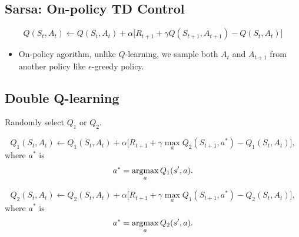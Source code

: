 \subsection{Sarsa: On-policy TD Control}
$$Q(S_t, A_t) \leftarrow Q(S_t, A_t)+ \alpha \Big[R_{t+1}+\gamma Q(S_{t+1}, A_{t+1})-Q(S_t, A_t)\Big] $$
\begin{itemize}
	\item On-policy agorithm, unlike $Q$-learning, we sample both $A_t$ and $A_{t+1}$ from another policy like $\epsilon$-greedy policy. 
\end{itemize}


\subsection{Double Q-learning}

Randomly select $Q_1$ or $Q_2$.

$$Q_1(S_t, A_t) \leftarrow Q_1(S_t, A_t)+ \alpha \Big[R_{t+1}+\gamma \max_a Q_2(S_{t+1}, a^*)-Q_1(S_t, A_t)\Big], $$
where $a^*$ is 
$$a^* = \operatorname*{\operatorname{argmax}}_a Q_1(s',a).$$

$$Q_2(S_t, A_t) \leftarrow Q_2(S_t, A_t)+ \alpha \Big[R_{t+1}+\gamma \max_a Q_1(S_{t+1}, a^*)-Q_2(S_t, A_t)\Big], $$
where $a^*$ is 
$$a^* = \operatorname*{\operatorname{argmax}}_a Q_2(s',a).$$
